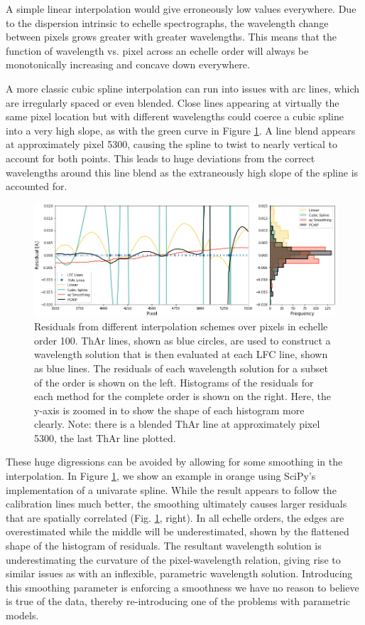 \documentclass[modern]{aastex63}
\begin{document}
A simple linear interpolation would give erroneously low values everywhere.  Due to the dispersion intrinsic to echelle spectrographs, the wavelength change between pixels grows greater with greater wavelengths.  This means that the function of wavelength vs. pixel across an echelle order will always be monotonically increasing and concave down everywhere.

A more classic cubic spline interpolation can run into issues with arc lines, which are irregularly spaced or even blended.  Close lines appearing at virtually the same pixel location but with different wavelengths could coerce a cubic spline into a very high slope, as with the green curve in Figure \ref{fig:xinterp}.  A line blend appears at approximately pixel 5300, causing the spline to twist to nearly vertical to account for both points.  This leads to huge deviations from the correct wavelengths around this line blend as the extraneously high slope of the spline is accounted for.

\begin{figure}[t]
\centering
\includegraphics[width=\textwidth]{Figures/intpx_tests.png}
\caption{Residuals from different interpolation schemes over pixels in echelle order 100.  ThAr lines, shown as blue circles, are used to construct a wavelength solution that is then evaluated at each LFC line, shown as blue lines.  The residuals of each wavelength solution for a subset of the order is shown on the left.  Histograms of the residuals for each method for the complete order is shown on the right.  Here, the y-axis is zoomed in to show the shape of each histogram more clearly.  Note: there is a blended ThAr line at approximately pixel 5300, the last ThAr line plotted.}
\label{fig:xinterp}
\end{figure} 

These huge digressions can be avoided by allowing for some smoothing in the interpolation.  In Figure \ref{fig:xinterp}, we show an example in orange using SciPy's implementation of a univarate spline.  While the result appears to follow the calibration lines much better, the smoothing ultimately causes larger residuals that are spatially correlated (Fig. \ref{fig:xinterp}, right).  In all echelle orders, the edges are overestimated while the middle will be underestimated, shown by the flattened shape of the histogram of residuals.  The resultant wavelength solution is underestimating the curvature of the pixel-wavelength relation, giving rise to similar issues as with an inflexible, parametric wavelength solution.  Introducing this smoothing parameter is enforcing a smoothness we have no reason to believe is true of the data, thereby re-introducing one of the problems with parametric models.
\end{document}
